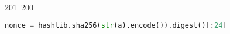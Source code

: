 201~200~\documentclass{article}
\begin{document}
\begin{lstlisting}[language=Python, caption=Signature for Chall 3]
	                                                                        	                                                                    	                                	                    	                    	                        	                        	                    	                                                                	                	                                                                    	                    							                                                                                                                                                                                                    		                                                                                            nonce = hashlib.sha256(str(a).encode()).digest()[:24]
	                                                                        	                                                                    	                                	                    	                    	                        	                        	                    	                                                                	                	                                                                    	                    							                                                                                                                                                                                                    		                                                                                                cipher = ChaCha20.new(key=key, nonce = nonce)
	                                                                        	                                                                    	                                	                    	                    	                        	                        	                    	                                                                	                	                                                                    	                    							                                                                                                                                                                                                    		                                                                                                    #ciphertext = cipher.encrypt(plaintext)
	                                                                        	                                                                    	                                	                    	                    	                        	                        	                    	                                                                	                	                                                                    	                    							                                                                                                                                                                                                    		                                                                                                        size_n = ceil(RR(log(n,2))/8) #taille en bytes

\end{lstlisting}
\end{document}
